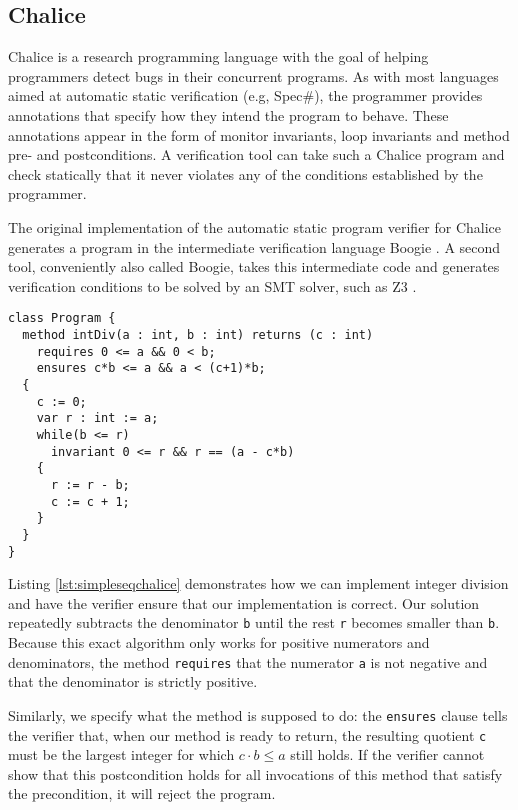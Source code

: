 
\subsection{Chalice}
Chalice is a research programming language with the goal of helping programmers detect bugs in their concurrent programs. 
As with most languages aimed at automatic static verification (e.g, Spec\#), the programmer provides annotations that specify how they intend the program to behave.
These annotations appear in the form of monitor invariants, loop invariants and method pre- and postconditions.
A verification tool can take such a Chalice program and check statically that it never violates any of the conditions established by the programmer.

The original implementation of the automatic static program verifier for Chalice generates a program in the intermediate verification language Boogie \cite{ByECD+06}.
A second tool, conveniently also called Boogie, takes this intermediate code and generates verification conditions to be solved by an SMT solver, such as Z3 \cite{dMB08}.

\begin{lstlisting}[language=Chalice,float,caption={Loop invariants, pre- and post conditions in a Chalice program},label=lst:simpleseqchalice]
class Program {
  method intDiv(a : int, b : int) returns (c : int)
    requires 0 <= a && 0 < b;
    ensures c*b <= a && a < (c+1)*b;
  {
    c := 0;
    var r : int := a;
    while(b <= r)
      invariant 0 <= r && r == (a - c*b)
    {
      r := r - b;
      c := c + 1;
    }
  }
}
\end{lstlisting}

Listing \ref{lst:simpleseqchalice} demonstrates how we can implement integer division and have the verifier ensure that our implementation is correct.
Our solution repeatedly subtracts the denominator \lstinline!b! until the rest \lstinline!r! becomes smaller than \lstinline!b!. 
Because this exact algorithm only works for positive numerators and denominators, the method \lstinline[language=chalice]!requires! that the numerator \lstinline!a! is not negative and that the denominator is strictly positive.

Similarly, we specify what the method is supposed to do: the \lstinline[language=Chalice]!ensures! clause tells the verifier that, when our method is ready to return, the resulting quotient \lstinline!c! must be the largest integer for which $c \cdot b \leq a$ still holds.
If the verifier cannot show that this postcondition holds for all invocations of this method that satisfy the precondition, it will reject the program.


